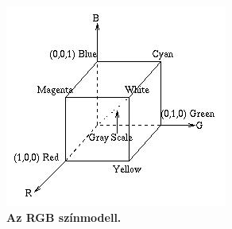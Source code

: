 \documentclass[12pt]{article}
\theoremstyle{plain}
\begin{document}
\begin{figure}[H]
    \begin{center}
    \includegraphics[width=0.55\linewidth]{media/rgb.jpg}
    \caption{\textbf{Az RGB színmodell.}} 
    \label{fig:rgb}
    \end{center}
\end{figure}




\end{document}
